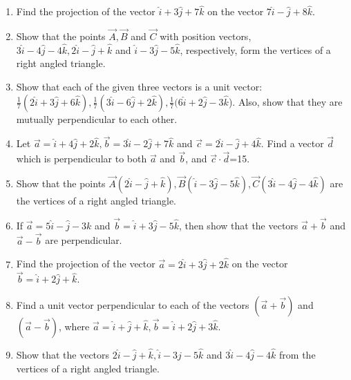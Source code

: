 \begin{enumerate}[label=\thesubsection.\arabic*, ref=\thesubsection.\theenumi]
\item Find the projection of the vector $\hat{i}+3\hat{j}+7\hat{k}$ on the vector $7\hat{i}-\hat{j}+8\hat{k}$.
	\\
	\solution
		
\item Show that the points $\vec{A},  \vec{B}$ and $\vec{C}$ with position vectors,  $3\hat{i}-4\hat{j}-4\hat{k},  2\hat{i}-\hat{j}+\hat{k}$ and $\hat{i}-3\hat{j}-5\hat{k}$,  respectively,  form the vertices of a right angled
triangle.
\\
\solution
		
\item Show that each of the given three vectors is a unit vector: 
 $\frac{1}{7}(2\hat{i}+3\hat{j}+6\hat{k}), \frac{1}{7}(3\hat{i}-6\hat{j}+2\hat{k}), \frac{1}{7}(6\hat{i}+2\hat{j}-3\hat{k}$).
Also, show that they are mutually perpendicular to each other.
	\\
	\solution
		
\item Let $\vec{a}=\hat{i}+4\hat{j}+2\hat{k},  \vec{b}=3\hat{i}-2\hat{j}+7\hat{k}$ and $\vec{c}=2\hat{i}-\hat{j}+4\hat{k}$. Find a vector $\vec{d}$ which is perpendicular to both $\vec{a}$ and $\vec{b}$,  and $\vec{c}\cdot \vec{d}$=15.\\
	\solution
		
\item Show that the points $\vec{A}(2\hat{i} -\hat{j} +\hat{k}), \vec{B}(\hat{i} -3\hat{j}-5\hat{k}),\vec{C}(3\hat{i} -4\hat{j} -4\hat{k})$ are the vertices of a right angled triangle.
\item If $\overrightarrow{a} = 5\hat{i} -\hat{j} -3{k}$ and $\overrightarrow{b} = \hat{i} +3\hat{j} -5\hat{k}$, then show that the vectors $\overrightarrow{a}+\overrightarrow{b}$ and $\overrightarrow{a}-\overrightarrow{b}$ are perpendicular.
\item Find the projection of the vector $\overrightarrow{a} = 2\hat{i} +3\hat{j} +2\hat{k}$ on the vector $\overrightarrow{b} = \hat{i} +2\hat{j} +\hat{k}$.
\item Find a unit vector perpendicular to each of the vectors $(\overrightarrow{a} +\overrightarrow{b})$ and $(\overrightarrow{a} -\overrightarrow{b})$, where $\overrightarrow{a}=\hat{i} +\hat{j} +\hat{k}, \overrightarrow{b} = \hat{i} +2\hat{j} +3\hat{k}$.
\item Show that the vectors $2\hat{i}-\hat{j}+\hat{k}, \hat{i}-3\hat{j}-5\hat{k}$ and  $3\hat{i}-4\hat{j}-4\hat{k}$ from the vertices of a right angled triangle.

\end{enumerate}
